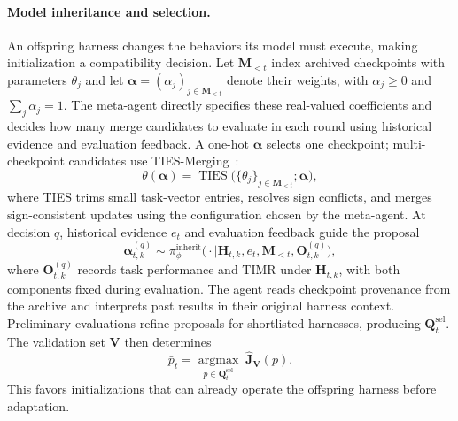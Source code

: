 \documentclass[11pt,a4paper]{article}
\begin{document}
\paragraph{Model inheritance and selection.}
An offspring harness changes the behaviors its model must execute, making initialization a compatibility decision. Let $\mathbf{M}_{<t}$ index archived checkpoints with parameters $\theta_j$ and let $\boldsymbol{\alpha}=(\alpha_j)_{j\in\mathbf{M}_{<t}}$ denote their weights, with $\alpha_j\geq0$ and $\sum_j\alpha_j=1$. The meta-agent directly specifies these real-valued coefficients and decides how many merge candidates to evaluate in each round using historical evidence and evaluation feedback. A one-hot $\boldsymbol{\alpha}$ selects one checkpoint; multi-checkpoint candidates use TIES-Merging~\citep{yadav2023tiesmerging}:
\begin{equation}
\theta(\boldsymbol{\alpha})=\operatorname{TIES}\bigl(\{\theta_j\}_{j\in\mathbf{M}_{<t}};\boldsymbol{\alpha}\bigr),
\label{eq:lineage-recipe}
\end{equation}
where TIES trims small task-vector entries, resolves sign conflicts, and merges sign-consistent updates using the configuration chosen by the meta-agent. At decision $q$, historical evidence $e_t$ and evaluation feedback guide the proposal
\begin{equation}
\boldsymbol{\alpha}_{t,k}^{(q)}\sim\pi_\phi^{\mathrm{inherit}}\bigl(\cdot\mid\mathbf{H}_{t,k},e_t,\mathbf{M}_{<t},\mathbf{O}_{t,k}^{(q)}\bigr),
\label{eq:lineage-model-search}
\end{equation}
where $\mathbf{O}_{t,k}^{(q)}$ records task performance and TIMR under $\mathbf{H}_{t,k}$, with both components fixed during evaluation. The agent reads checkpoint provenance from the archive and interprets past results in their original harness context. Preliminary evaluations refine proposals for shortlisted harnesses, producing $\mathbf{Q}_t^{\mathrm{sel}}$. The validation set $\mathbf{V}$ then determines
\begin{equation}
\bar p_t=\underset{p\in\mathbf{Q}_t^{\mathrm{sel}}}{\operatorname{argmax}}\;\widehat{\mathbf{J}}_{\mathbf{V}}(p).
\label{eq:lineage-select}
\end{equation}
This favors initializations that can already operate the offspring harness before adaptation.
\end{document}
